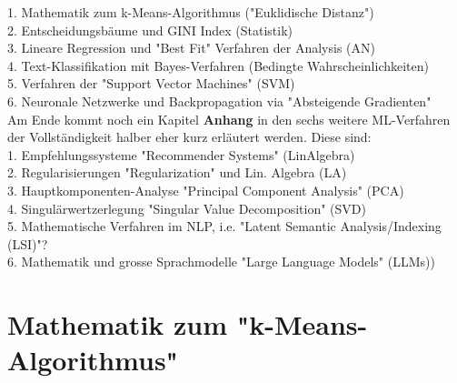 \documentclass[12pt]{article}
\begin{document}

1. Mathematik zum k-Means-Algorithmus ("Euklidische Distanz")\\

2. Entscheidungsbäume und GINI Index (Statistik)\\

3. Lineare Regression und "Best Fit" Verfahren der Analysis (AN)\\

4. Text-Klassifikation mit Bayes-Verfahren (Bedingte Wahrscheinlichkeiten)\\
 
5. Verfahren der "Support Vector Machines" (SVM)\\

6. Neuronale Netzwerke und Backpropagation via "Absteigende Gradienten"\\[0.2cm]
%
Am Ende kommt noch ein Kapitel \textbf{Anhang} in den sechs weitere ML-Verfahren der Vollständigkeit halber eher kurz erläutert werden. Diese sind:\\

1. Empfehlungssysteme "Recommender Systems" (LinAlgebra)\\

2. Regularisierungen "Regularization" und Lin. Algebra (LA)\\

3. Hauptkomponenten-Analyse "Principal Component Analysis" (PCA)\\
 
4. Singulärwertzerlegung "Singular Value Decomposition" (SVD)\\
 
5. Mathematische Verfahren im NLP, i.e. "Latent Semantic Analysis/Indexing (LSI)"?\\

6. Mathematik und grosse Sprachmodelle "Large Language Models" (LLMs))

\newpage

\section{Mathematik zum "k-Means-Algorithmus" \\}
\end{document}
